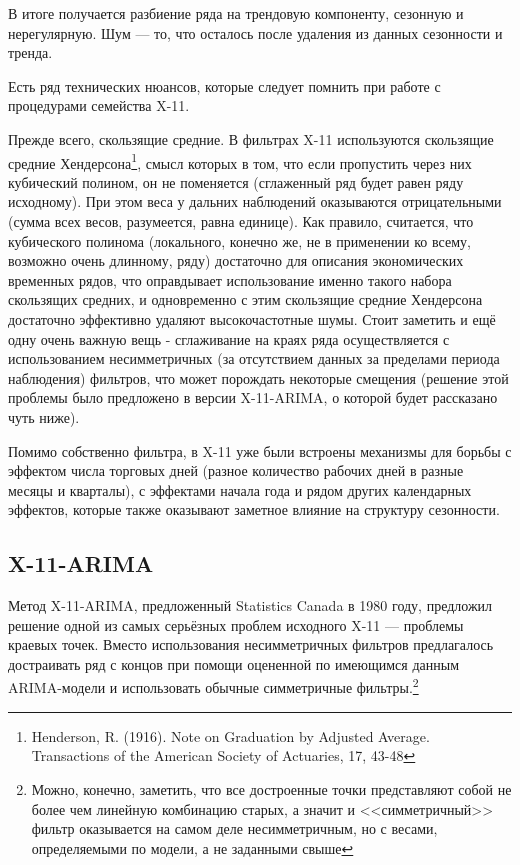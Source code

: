 \documentclass[final,pdftex]{../../template/epsilonj}\usepackage[]{graphicx}\usepackage[]{color}
\begin{document}
В итоге получается разбиение ряда на трендовую компоненту, сезонную и нерегулярную. Шум --- то, что осталось после удаления из данных сезонности и тренда. 

Есть ряд технических нюансов, которые следует помнить при работе с процедурами семейства X-11. 

Прежде всего, скользящие средние. В фильтрах X-11 используются скользящие средние Хендерсона\footnote{Henderson, R. (1916). Note on Graduation by Adjusted Average. Transactions of the American Society of Actuaries, 17, 43-48}, смысл которых в том, что если пропустить через них кубический полином, он не поменяется (сглаженный ряд будет равен ряду исходному). При этом веса у дальних наблюдений оказываются отрицательными (сумма всех весов, разумеется, равна единице). Как правило, считается, что кубического полинома (локального, конечно же, не в применении ко всему, возможно очень длинному, ряду) достаточно для описания экономических временных рядов, что оправдывает использование именно такого набора скользящих средних, и одновременно с этим скользящие средние Хендерсона достаточно эффективно удаляют высокочастотные шумы. 
Стоит заметить и ещё одну очень важную вещь - сглаживание на краях ряда осуществляется с использованием несимметричных (за отсутствием данных за пределами периода наблюдения) фильтров, что может порождать некоторые смещения (решение этой проблемы было предложено в версии X-11-ARIMA, о которой будет рассказано чуть ниже). 

Помимо собственно фильтра, в X-11 уже были встроены механизмы для борьбы с эффектом числа торговых дней (разное количество рабочих дней в разные месяцы и кварталы), с эффектами начала года и рядом других календарных эффектов, которые также оказывают заметное влияние на структуру сезонности. 

\subsection{X-11-ARIMA}

Метод X-11-ARIMA, предложенный Statistics Canada в 1980 году, предложил решение одной из самых серьёзных проблем исходного X-11 --- проблемы краевых точек. Вместо использования несимметричных фильтров предлагалось достраивать ряд с концов при помощи оцененной по имеющимся данным ARIMA-модели и использовать обычные симметричные фильтры.\footnote{Можно, конечно, заметить, что все достроенные точки представляют собой не более чем линейную комбинацию старых, а значит и <<симметричный>> фильтр оказывается на самом деле несимметричным, но с весами, определяемыми по модели, а не заданными свыше} 
\end{document}
